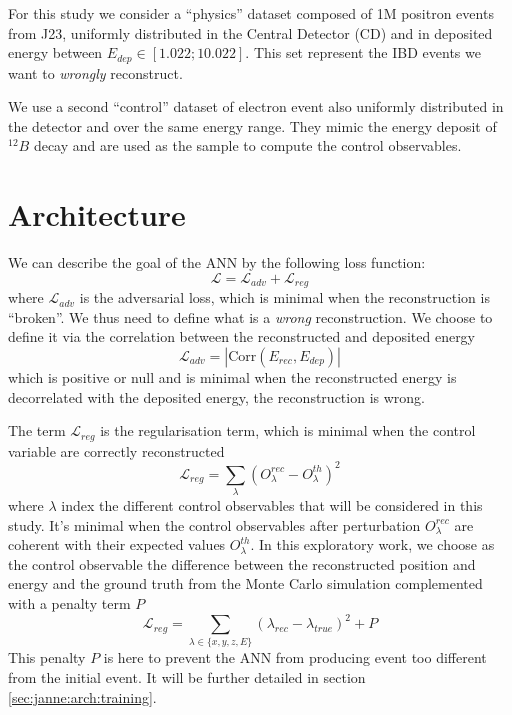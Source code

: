 \documentclass[../main.tex]{subfiles}
\begin{document}
For this study we consider a ``physics'' dataset composed of 1M positron events from J23, uniformly distributed in the Central Detector (CD) and in deposited energy between $E_{dep} \in [1.022; 10.022]$. This set represent the IBD events we want to \textit{wrongly} reconstruct.

We use a second ``control'' dataset of electron event also uniformly distributed in the detector and over the same energy range. They mimic the energy deposit of $^{12}B$ decay and are used as the sample to compute the control observables.

\section{Architecture}
\label{sec:janne:arch}
We can describe the goal of the ANN by the following loss function:
\begin{equation}
  \label{eq:janne:loss}
  \mathcal{L} = \mathcal{L}_{adv} + \mathcal{L}_{reg}
\end{equation}
where $\mathcal{L}_{adv}$ is the adversarial loss, which is minimal when the reconstruction is ``broken''. We thus need to define what is a \textit{wrong} reconstruction. We choose to define it via the correlation between the reconstructed and deposited energy
\begin{equation}
  \mathcal{L}_{adv} = |\mathrm{Corr}(E_{rec}, E_{dep})|
\end{equation}
which is positive or null and is minimal when the reconstructed energy is decorrelated with the deposited energy, the reconstruction is wrong.

The term $\mathcal{L}_{reg}$ is the regularisation term, which is minimal when the control variable are correctly reconstructed
\begin{equation}
  \mathcal{L}_{reg} = \sum_\lambda (O^{rec}_\lambda - O^{th}_\lambda)^2
\end{equation}
where $\lambda$ index the different control observables that will be considered in this study. It's minimal when the control observables after perturbation $O^{rec}_\lambda$ are coherent with their expected values $O^{th}_\lambda$.
In this exploratory work, we choose as the control observable the difference between the reconstructed position and energy and the ground truth from the Monte Carlo simulation complemented with a penalty term $P$
\begin{equation}
  \mathcal{L}_{reg} = \sum_{\lambda \in \{x, y, z, E\}} (\lambda_{rec} - \lambda_{true})^2 + P
\end{equation}
This penalty $P$ is here to prevent the ANN from producing event too different from the initial event. It will be further detailed in section \ref{sec:janne:arch:training}.
\end{document}
